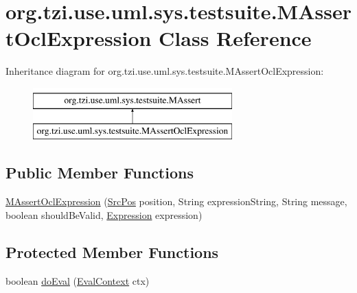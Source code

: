 \hypertarget{classorg_1_1tzi_1_1use_1_1uml_1_1sys_1_1testsuite_1_1_m_assert_ocl_expression}{\section{org.\-tzi.\-use.\-uml.\-sys.\-testsuite.\-M\-Assert\-Ocl\-Expression Class Reference}
\label{classorg_1_1tzi_1_1use_1_1uml_1_1sys_1_1testsuite_1_1_m_assert_ocl_expression}
}
Inheritance diagram for org.\-tzi.\-use.\-uml.\-sys.\-testsuite.\-M\-Assert\-Ocl\-Expression\-:\begin{figure}[H]
\begin{center}
\leavevmode
\includegraphics[height=2.000000cm]{classorg_1_1tzi_1_1use_1_1uml_1_1sys_1_1testsuite_1_1_m_assert_ocl_expression}
\end{center}
\end{figure}
\subsection*{Public Member Functions}
\begin{DoxyCompactItemize}
\item 
\hyperlink{classorg_1_1tzi_1_1use_1_1uml_1_1sys_1_1testsuite_1_1_m_assert_ocl_expression_a1684fb6f16d9a2ac2be8da356913f002}{M\-Assert\-Ocl\-Expression} (\hyperlink{classorg_1_1tzi_1_1use_1_1parser_1_1_src_pos}{Src\-Pos} position, String expression\-String, String message, boolean should\-Be\-Valid, \hyperlink{classorg_1_1tzi_1_1use_1_1uml_1_1ocl_1_1expr_1_1_expression}{Expression} expression)
\end{DoxyCompactItemize}
\subsection*{Protected Member Functions}
\begin{DoxyCompactItemize}
\item 
boolean \hyperlink{classorg_1_1tzi_1_1use_1_1uml_1_1sys_1_1testsuite_1_1_m_assert_ocl_expression_acf69e6ec10383ec81a6dcb2253661e7a}{do\-Eval} (\hyperlink{classorg_1_1tzi_1_1use_1_1uml_1_1ocl_1_1expr_1_1_eval_context}{Eval\-Context} ctx)
\end{DoxyCompactItemize}


